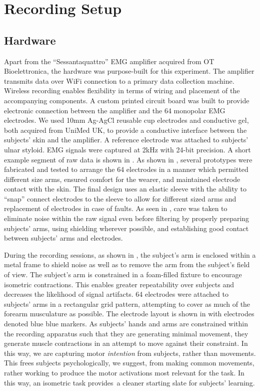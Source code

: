 \documentclass[../main.tex]{subfiles}
\begin{document}
\section{Recording Setup}\label{sec:setup}

\subsection{Hardware}

Apart from the ``Sessantaquattro'' EMG amplifier acquired from OT Bioelettronica, the hardware was purpose-built for this experiment. The amplifier transmits data over WiFi connection to a primary data collection machine. Wireless recording enables flexibility in terms of wiring and placement of the accompanying components. A custom printed circuit board was built to provide electronic connection between the amplifier and the 64 monopolar EMG electrodes. We used 10mm Ag-AgCl reusable cup electrodes and conductive gel, both acquired from UniMed UK, to provide a conductive interface between the subjects' skin and the amplifier. A reference electrode was attached to subjects' ulnar styloid. EMG signals were captured at 2kHz with 24-bit precision. A short example segment of raw data is shown in . As shown in , several prototypes were fabricated and tested to arrange the 64 electrodes in a manner which permitted different size arms, ensured comfort for the wearer, and maintained electrode contact with the skin. The final design uses an elastic sleeve with the ability to ``snap'' connect electrodes to the sleeve to allow for different sized arms and replacement of electrodes in case of faults. As seen in , care was taken to eliminate noise within the raw signal even before filtering by properly preparing subjects' arms, using shielding wherever possible, and establishing good contact between subjects' arms and electrodes.

During the recording sessions, as shown in , the subject's arm is enclosed within a metal frame to shield noise as well as to remove the arm from the subject's field of view. The subject's arm is constrained in a foam-filled fixture to encourage isometric contractions. This enables greater repeatability over subjects and decreases the likelihood of signal artifacts. 64 electrodes were attached to subjects' arms in a rectangular grid pattern, attempting to cover as much of the forearm musculature as possible. The electrode layout is shown in  with electrodes denoted blue blue markers.  As subjects' hands and arms are constrained within the recording apparatus such that they are generating minimal movement, they generate muscle contractions in an attempt to move against their constraint. In this way, we are capturing motor \textit{intention} from subjects, rather than movements. This frees subjects psychologically, we suggest, from making common movements, rather working to produce the motor activations most relevant for the task. In this way, an isometric task provides a cleaner starting slate for subjects' learning. 
\end{document}
